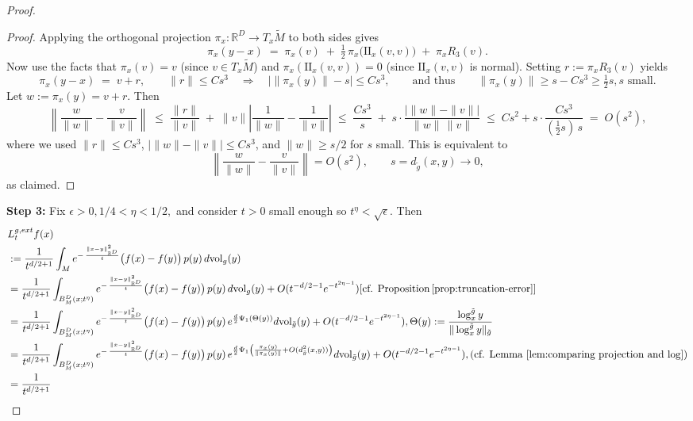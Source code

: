 \documentclass{amsart}
\theoremstyle{definition}
\theoremstyle{remark}
\newcommand{\nd}{\noindent}
\newcommand{\norm}[1]{\left\lVert#1\right\rVert}
\newcommand{\Ddim}{\mathbb{R}^D}
\newcommand{\0}{\boldsymbol{0}}
\begin{document}
\begin{proof}
\begin{proof}
Applying the orthogonal projection $\pi_x:\mathbb{R}^D \to T_x\widetilde{M}$ to both sides gives
\[
\pi_x(y - x)
\;=\;
\pi_x(v)
\;+\;
\tfrac{1}{2}\,\pi_x\!\big(\mathrm{II}_x(v,v)\big)
\;+\;
\pi_x R_3(v).
\]
Now use the facts that 
$\pi_x(v) = v$ (since $v\in T_x\widetilde{M}$) and 
$\pi_x(\mathrm{II}_x(v,v)) = 0$ (since $\mathrm{II}_x(v,v)$ is normal). 
Setting $r := \pi_x R_3(v)$ yields
\[
\pi_x(y - x)
\;=\;
v + r,
\qquad
\|r\| \le C s^3\quad\Longrightarrow\quad
\big|\|\pi_x(y)\|-s\big| \le C s^{3},
\qquad\text{and thus}\qquad
\|\pi_x(y)\|\ge s-C s^{3}\ge \tfrac12 s, s \text{ small.}
\]
Let $w:=\pi_x(y)=v+r$. Then
\[
\left\|\frac{w}{\|w\|}-\frac{v}{\|v\|}\right\|
\;\le\;
\frac{\|r\|}{\|v\|} 
\;+\;
\|v\|\left|\frac{1}{\|w\|}-\frac{1}{\|v\|}\right|
\;\le\;
\frac{C s^{3}}{s}
\;+\;
s \cdot \frac{|\|w\|-\|v\||}{\|w\|\,\|v\|}
\;\le\;
C s^{2} + s\cdot\frac{C s^{3}}{(\tfrac12 s)\,s}
\;=\;O(s^{2}),
\]
where we used $\|r\|\le C s^3$, $|\|w\|-\|v\||\le C s^3$, and $\|w\|\ge s/2$ for $s$ small.
This is equivalent to
\[
\left\|\frac{w}{\|w\|}-\frac{v}{\|v\|}\right\|
= O(s^{2}),
\qquad s=d_{\tilde g}(x,y)\to 0,
\]
as claimed.
\end{proof}
\nd \textbf{Step 3: }Fix $\epsilon>0, 1/4 < \eta < 1/2,$ and consider $t>0$ small enough so $t^{\eta}< \sqrt{\epsilon}$. Then
\begin{equation}
\begin{aligned}
& L^{g, ext}_tf(x)\\
 &:=\frac{1}{t^{d/2+1}}
\int_{M} e^{-\,\frac{\|x-y\|_{\Ddim}^{2}}{t}} \big(f(x)-f(y)\big)\,p(y)\,d\mathrm{vol}_{g}(y)\\
&= \frac{1}{t^{d/2+1}}
\int_{B_M^D(x;t^{\eta})} e^{-\,\frac{\|x-y\|_{\Ddim}^{2}}{t}} \big(f(x)-f(y)\big)\,p(y)\,d\mathrm{vol}_{g}(y) +O(t^{-d/2-1}e^{-t^{2\eta-1}}) [\text{cf. Proposition}\,\ref{prop:truncation-error}]  \\
&=\frac{1}{t^{d/2+1}}
\int_{B_M^D(x;t^{\eta})} e^{-\,\frac{\|x-y\|_{\Ddim}^{2}}{t}} \big(f(x)-f(y)\big)\,p(y)\, e^{\frac{d}{2}\Psi_1(\Theta(y))}d\mathrm{vol}_{\tilde{g}}(y) + O(t^{-d/2-1}e^{-t^{2\eta-1}}), \Theta(y):=\frac{\log_x^{\tilde g} y}{\|\log_x^{\tilde g} y\|_{\tilde g}}\\
&= \frac{1}{t^{d/2+1}}
\int_{B_M^D(x;t^{\eta})} e^{-\,\frac{\|x-y\|_{\Ddim}^{2}}{t}} \big(f(x)-f(y)\big)\,p(y)\, e^{\frac{d}{2}\Psi_1\left(\frac{\pi_x(y)}{\norm{\pi_x(y)}} + O(d^2_{\tilde{g}}(x,y))\right)}d\mathrm{vol}_{\tilde{g}}(y)+O(t^{-d/2-1}e^{-t^{2\eta-1}}) , (\text{cf. Lemma \ref{lem:comparing projection and log}})\\
 &= \frac{1}{t^{d/2+1}}

\end{aligned}
\end{equation}
\end{proof}
\end{document}

